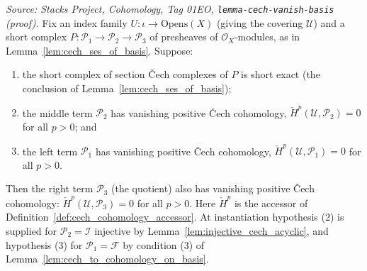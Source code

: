 \begin{lemma}

  \label{lem:quotient_vanishing_cech}
  \textit{Source: Stacks Project, Cohomology, Tag 01EO,
  \texttt{lemma-cech-vanish-basis} (proof).}
  Fix an index family \(U : \iota \to \mathrm{Opens}(X)\) (giving the covering \(\mathcal{U}\)) and a
  short complex \(P : \mathcal{P}_1 \to \mathcal{P}_2 \to \mathcal{P}_3\) of presheaves of
  \(\mathcal{O}_X\)-modules, as in Lemma~\ref{lem:cech_ses_of_basis}. Suppose:
  \begin{enumerate}
  \item the short complex of section {\v C}ech complexes of \(P\) is short exact (the conclusion of
    Lemma~\ref{lem:cech_ses_of_basis});
  \item the middle term \(\mathcal{P}_2\) has vanishing positive {\v C}ech cohomology,
    \(\check{H}^p(\mathcal{U}, \mathcal{P}_2) = 0\) for all \(p > 0\); and
  \item the left term \(\mathcal{P}_1\) has vanishing positive {\v C}ech cohomology,
    \(\check{H}^p(\mathcal{U}, \mathcal{P}_1) = 0\) for all \(p > 0\).
  \end{enumerate}
  Then the right term \(\mathcal{P}_3\) (the quotient) also has vanishing positive {\v C}ech
  cohomology: \(\check{H}^p(\mathcal{U}, \mathcal{P}_3) = 0\) for all \(p > 0\). Here
  \(\check{H}^p\) is the accessor of Definition~\ref{def:cech_cohomology_accessor}. At instantiation
  hypothesis (2) is supplied for \(\mathcal{P}_2 = \mathcal{I}\) injective by
  Lemma~\ref{lem:injective_cech_acyclic}, and hypothesis (3) for \(\mathcal{P}_1 = \mathcal{F}\) by
  condition (3) of Lemma~\ref{lem:cech_to_cohomology_on_basis}.
\end{lemma}


